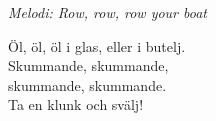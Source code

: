 {\footnotesize\textit{Melodi: Row, row, row your boat}}\par
\vspace{10pt}
Öl, öl, öl i glas, eller i butelj.\\
Skummande, skummande,\\
skummande, skummande.\\
Ta en klunk och svälj!
